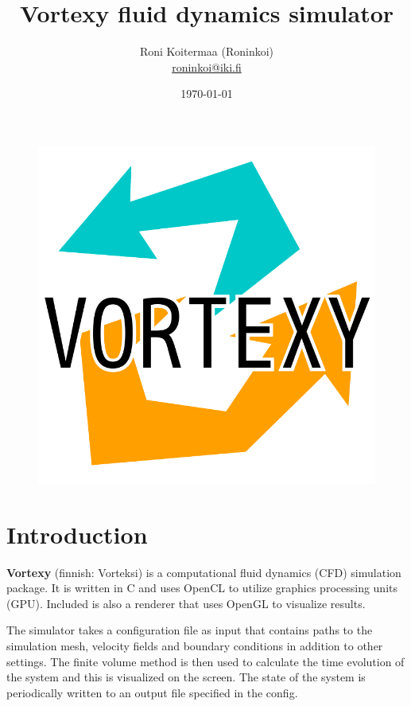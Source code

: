 \documentclass[12pt]{article}
\title {
  Vortexy fluid dynamics simulator
}
\date{\today}
\author {
  Roni Koitermaa (Roninkoi) \\
  \href{mailto:roninkoi@iki.fi}{roninkoi@iki.fi}
}
\begin{document}
\setlength{\belowcaptionskip}{10pt}


\normalsize

\maketitle

\begin{figure}[!h]
  \centering
  \centering
  \includegraphics[width=0.7\linewidth]{gfx/vortexylogo.pdf}
\end{figure}

\newpage

\tableofcontents

\newpage

\section{Introduction}

{\bf Vortexy} (finnish: Vorteksi) is a computational fluid dynamics (CFD) simulation package. It is written in C and uses OpenCL to utilize graphics processing units (GPU). Included is also a renderer that uses OpenGL to visualize results.

The simulator takes a configuration file as input that contains paths to the simulation mesh, velocity fields and boundary conditions in addition to other settings. The finite volume method is then used to calculate the time evolution of the system and this is visualized on the screen. The state of the system is periodically written to an output file specified in the config.
\end{document}
